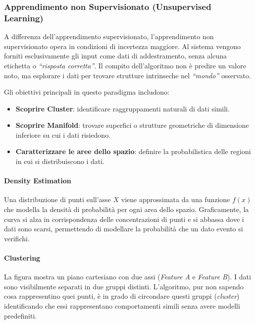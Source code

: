 \subsubsection{Apprendimento non Supervisionato (Unsupervised Learning)}

A differenza dell'apprendimento supervisionato, l'apprendimento non
supervisionato opera in condizioni di incertezza maggiore. Al sistema
vengono forniti esclusivamente gli input come dati di addestramento,
senza alcuna etichetta o \textit{``risposta corretta''}. Il compito
dell'algoritmo non è predire un valore noto, ma esplorare i dati per
trovare strutture intrinseche nel \textit{``mondo''} osservato.

Gli obiettivi principali in questo paradigma includono:

\begin{itemize}
    \item \textbf{Scoprire Cluster}: identificare raggruppamenti naturali di dati simili.
    \item \textbf{Scoprire Manifold}: trovare superfici o strutture
    geometriche di dimensione inferiore su cui i dati risiedono.
    \item \textbf{Caratterizzare le aree dello spazio}: definire la
    probabilistica delle regioni in cui si distribuiscono i dati.
\end{itemize}

\paragraph{Density Estimation}
Una distribuzione di punti sull'asse $X$ viene approssimata da una
funzione $f(x)$ che modella la densità di probabilità per ogni area
dello spazio. Graficamente, la curva si alza in corrispondenza delle
concentrazioni di punti e si abbassa dove i dati sono scarsi,
permettendo di modellare la probabilità che un dato evento si verifichi.

\paragraph{Clustering}
La figura mostra un piano cartesiano con due assi (\textit{Feature A} e
\textit{Feature B}). I dati sono visibilmente separati in due gruppi
distinti. L'algoritmo, pur non sapendo cosa rappresentino quei punti, è
in grado di circondare questi gruppi (\textit{cluster}) identificando
che essi rappresentano comportamenti simili senza avere modelli
predefiniti.

